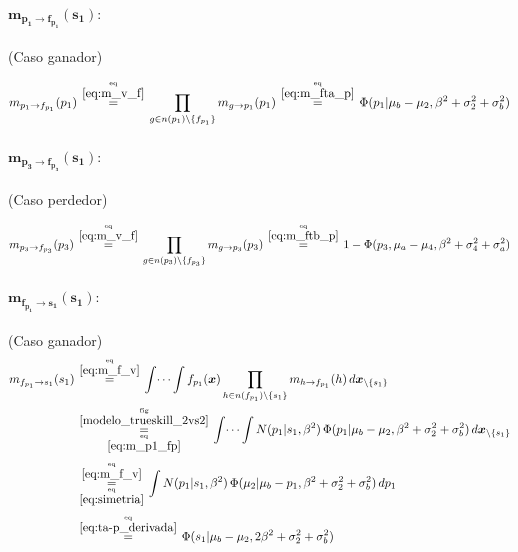 \documentclass[article]{jss}
\newcommand\hfrac[2]{\genfrac{}{}{0pt}{}{#1}{#2}} %
\begin{document}
\begin{appendix}
\paragraph{$\bm{m_{p_1 \rightarrow f_{p_1}}(s_1)}:$} (Caso ganador)

\begin{equation}\label{eq:m_p1_fp}
\begin{split}
 m_{p_1 \rightarrow f_{p_1}}(p_1) \overset{\hfrac{\text{eq}}{\ref{eq:m_v_f}}}{=} \prod_{g \in n(p_1) \setminus  \{f_{p_1} \}} m_{g \rightarrow p_1} (p_1)  \overset{\hfrac{\text{eq}}{\ref{eq:m_fta_p}}}{=}  \Phi(p_1| \mu_b - \mu_2, \beta^2 + \sigma_2^2 + \sigma_b^2)
\end{split}
\end{equation}


\paragraph{$\bm{m_{p_3 \rightarrow f_{p_3}}(s_1)}:$} (Caso perdedor)

\begin{equation}\label{eq:m_p3_fp}
\begin{split}
 m_{p_3 \rightarrow f_{p_3}}(p_3) \overset{\hfrac{\text{eq}}{\ref{eq:m_v_f}}}{=} \prod_{g \in n(p_3) \setminus  \{f_{p_3} \}} m_{g \rightarrow p_3} (p_3)  \overset{\hfrac{\text{eq}}{\ref{eq:m_ftb_p}}}{=}  1 - \Phi(p_3, \mu_a  - \mu_4, \beta^2 + \sigma_4^2 + \sigma_a^2)
\end{split}
\end{equation}

\paragraph{$\bm{m_{f_{p_1} \rightarrow s_1}(s_1)}:$} (Caso ganador)
\begin{equation}\label{eq:m_fp_s1}
\begin{split}
m_{f_{p_1} \rightarrow s_1}(s_1) & \overset{\hfrac{\text{eq}}{\ref{eq:m_f_v}}}{=} \int \dots \int f_{p_1}(\bm{x}) \prod_{h \in n(f_{p_1}) \setminus \{s_1\} } m_{h \rightarrow f_{p_1}}(h) \, d\bm{x}_{\setminus \{s_1\} }  \\
&\overset{\hfrac{\text{fig}}{\ref{modelo_trueskill_2vs2}}}{\underset{\hfrac{\text{eq}}{\ref{eq:m_p1_fp}}}{=}} \int \dots \int N(p_1| s_1, \beta^2) \, \Phi(p_1| \mu_b - \mu_2, \beta^2 + \sigma_2^2 + \sigma_b^2 ) \, d\bm{x}_{\setminus \{s_1\} }
\\[0.1cm]
& \overset{\hfrac{\text{eq}}{\ref{eq:m_f_v}}}{\underset{\hfrac{\text{eq}}{\ref{eq:simetria}}}{=}} \int N(p_1| s_1, \beta^2) \, \Phi(\mu_2| \mu_b -  p_1, \beta^2 + \sigma_2^2 + \sigma_b^2) \, dp_1 \\[0.1cm]
&\overset{\hfrac{\text{eq}}{\ref{eq:ta-p_derivada}}}{=} \Phi(s_1| \mu_b - \mu_2, 2\beta^2 + \sigma_2^2 + \sigma_b^2)
\end{split}
\end{equation}


\end{appendix}
\end{document}

